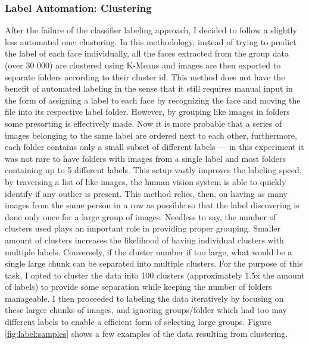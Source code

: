 \documentclass[11pt]{article}
\begin{document}
    \subsubsection{Label Automation: Clustering}\label{sec:face_labeling:clustering}
        After the failure of the classifier labeling approach, I decided to follow a slightly less automated one: clustering. In this methodology, instead of trying to predict the label of each face individually, all the faces extracted from the group data (over 30 000) are clustered using K-Means and images are then exported to separate folders according to their cluster id. This method does not have the benefit of automated labeling in the sense that it still requires manual input in the form of assigning a label to each face by recognizing the face and moving the file into its respective label folder. However, by grouping like images in folders some presorting is effectively made. Now it is more probable that a series of images belonging to the same label are ordered next to each other, furthermore, each folder contains only a small subset of different labels --- in this experiment it was not rare to have folders with images from a single label and most folders containing up to 5 different labels. This setup vastly improves the labeling speed, by traversing a list of like images, the human vision system is able to quickly identify if any outlier is present. This method relies, then, on having as many images from the same person in a row as possible so that the label discovering is done only once for a large group of images. Needless to say, the number of clusters used plays an important role in providing proper grouping. Smaller amount of clusters increases the likelihood of having individual clusters with multiple labels. Conversely, if the cluster number if too large, what would be a single large chunk can be separated into multiple clusters. For the purpose of this task, I opted to cluster the data into 100 clusters (approximately 1.5x the amount of labels) to provide some separation while keeping the number of folders manageable. I then proceeded to labeling the data iteratively by focusing on these larger chunks of images, and ignoring groups/folder which had too may different labels to enable a efficient form of selecting large groups. Figure \ref{fig:label:samples} shows a few examples of the data resulting from clustering.
\end{document}

